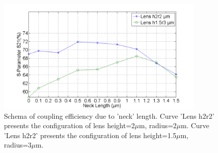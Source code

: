\begin{figure}[!ht]
\centering
\includegraphics[width=0.9\textwidth]{bilder/s21_neck}
\caption {Schema of coupling efficiency due to 'neck' length. Curve 'Lens h2r2' presents the configuration of lens height=2$\mu$m, radius=2$\mu$m. Curve 'Lens h2r2' presents the configuration of lens height=1.5$\mu$m, radius=3$\mu$m.}
\label{fig:s21_neck}
\end{figure}

